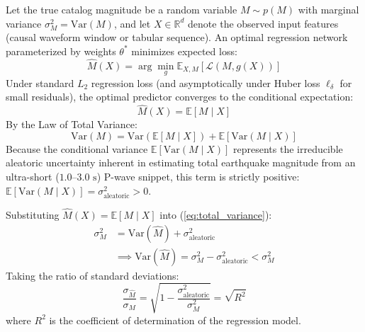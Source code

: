 \documentclass[journal]{IEEEtran}
\begin{document}
Let the true catalog magnitude be a random variable $M \sim p(M)$ with marginal variance $\sigma_M^2 = \text{Var}(M)$, and let $X \in \mathbb{R}^d$ denote the observed input features (causal waveform window or tabular sequence). An optimal regression network parameterized by weights $\theta^*$ minimizes expected loss:
\begin{equation}
\hat{M}(X) = \arg\min_g \mathbb{E}_{X, M} [ \mathcal{L}(M, g(X)) ]
\end{equation}
Under standard $L_2$ regression loss (and asymptotically under Huber loss $\ell_\delta$ for small residuals), the optimal predictor converges to the conditional expectation:
\begin{equation}
\hat{M}(X) = \mathbb{E}[M \mid X]
\label{eq:cond_exp}
\end{equation}
By the Law of Total Variance:
\begin{equation}
\text{Var}(M) = \text{Var}(\mathbb{E}[M \mid X]) + \mathbb{E}[\text{Var}(M \mid X)]
\label{eq:total_variance}
\end{equation}
Because the conditional variance $\mathbb{E}[\text{Var}(M \mid X)]$ represents the irreducible aleatoric uncertainty inherent in estimating total earthquake magnitude from an ultra-short ($1.0$--$3.0\text{ s}$) P-wave snippet, this term is strictly positive: $\mathbb{E}[\text{Var}(M \mid X)] = \sigma_{\text{aleatoric}}^2 > 0$.

Substituting $\hat{M}(X) = \mathbb{E}[M \mid X]$ into (\ref{eq:total_variance}):
\begin{align}
\sigma_M^2 &= \text{Var}(\hat{M}) + \sigma_{\text{aleatoric}}^2 \nonumber \\
&\implies \text{Var}(\hat{M}) = \sigma_M^2 - \sigma_{\text{aleatoric}}^2 < \sigma_M^2
\label{eq:var_shrinkage}
\end{align}
Taking the ratio of standard deviations:
\begin{equation}
\frac{\sigma_{\hat{M}}}{\sigma_M} = \sqrt{1 - \frac{\sigma_{\text{aleatoric}}^2}{\sigma_M^2}} = \sqrt{R^2}
\label{eq:sd_ratio_r2}
\end{equation}
where $R^2$ is the coefficient of determination of the regression model.
\end{document}

